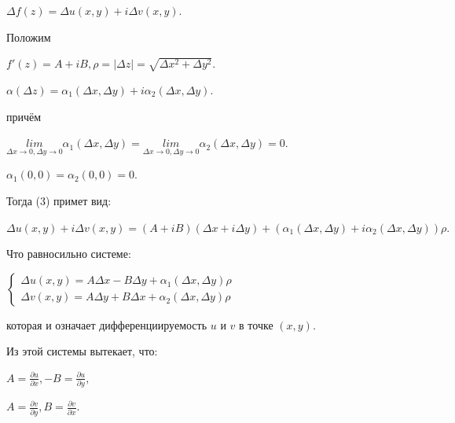 \documentclass[a4paper, 12pt]{report}
\begin{document}
\par\bigskip
\begin{center}
    $\Delta f(z) = \Delta u(x, y) + i\Delta v(x, y).$
\end{center}
\par\bigskip
Положим
\par\bigskip
\begin{center}
    $f'(z) = A + iB, \rho = |\Delta z| = \sqrt{\Delta x^2 + \Delta y^2}$.
    \par\bigskip
    $\alpha (\Delta z) = \alpha_1 (\Delta x, \Delta y) + i\alpha_2 (\Delta x, \Delta y).$
\end{center}
\par\bigskip
причём
\par\bigskip
\begin{center}
   $\underset{\Delta x \to 0, \Delta y \to 0}{lim} \alpha_1 (\Delta x, \Delta y) = \underset{\Delta x \to 0, \Delta y \to 0}{lim} \alpha_2 (\Delta x, \Delta y) = 0$.
   \par\bigskip
   $\alpha_1(0, 0) = \alpha_2(0,0) = 0$.
\end{center}
\par\bigskip
Тогда (3) примет вид:
\par\bigskip
\begin{center}
   $\Delta u(x, y) + i\Delta v(x, y) = (A + iB)(\Delta x + i\Delta y) + (\alpha_1 (\Delta x, \Delta y) + i\alpha_2 (\Delta x, \Delta y))\rho.$
\end{center}
\par\bigskip
Что равносильно системе:
\par\bigskip
\begin{center}
   $\begin{cases}
    \Delta u(x, y) = A\Delta x - B\Delta y + \alpha_1 (\Delta x, \Delta y)\rho \\
    \Delta v(x, y) = A\Delta y + B\Delta x + \alpha_2 (\Delta x, \Delta y)\rho
    \end{cases}$
\end{center}
\par\bigskip
которая и означает дифференциируемость $u $ и $ v$ в точке $(x, y)$.
\par 
Из этой системы вытекает, что:
\par\bigskip
\begin{center}
   $A = \frac{\partial u}{\partial x}, -B = \frac{\partial u}{\partial y},$
   \par\bigskip
   $ A = \frac{\partial v}{\partial y}, B = \frac{\partial v}{\partial x}.$
\end{center}
\par\bigskip
\end{document}
